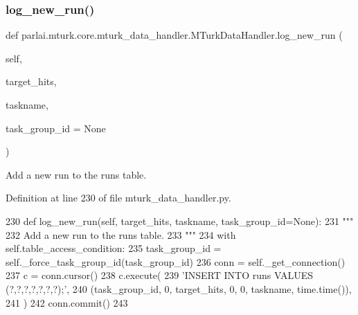 \subsubsection{\texorpdfstring{log\+\_\+new\+\_\+run()}{log\_new\_run()}}
{\footnotesize\ttfamily def parlai.\+mturk.\+core.\+mturk\+\_\+data\+\_\+handler.\+M\+Turk\+Data\+Handler.\+log\+\_\+new\+\_\+run (\begin{DoxyParamCaption}\item[{}]{self,  }\item[{}]{target\+\_\+hits,  }\item[{}]{taskname,  }\item[{}]{task\+\_\+group\+\_\+id = {\ttfamily None} }\end{DoxyParamCaption})}

\begin{DoxyVerb}Add a new run to the runs table.
\end{DoxyVerb}
 

Definition at line 230 of file mturk\+\_\+data\+\_\+handler.\+py.


\begin{DoxyCode}
230     \textcolor{keyword}{def }log\_new\_run(self, target\_hits, taskname, task\_group\_id=None):
231         \textcolor{stringliteral}{"""}
232 \textcolor{stringliteral}{        Add a new run to the runs table.}
233 \textcolor{stringliteral}{        """}
234         with self.table\_access\_condition:
235             task\_group\_id = self.\_force\_task\_group\_id(task\_group\_id)
236             conn = self.\_get\_connection()
237             c = conn.cursor()
238             c.execute(
239                 \textcolor{stringliteral}{'INSERT INTO runs VALUES (?,?,?,?,?,?,?);'},
240                 (task\_group\_id, 0, target\_hits, 0, 0, taskname, time.time()),
241             )
242             conn.commit()
243 
\end{DoxyCode}
\mbox{\label{classparlai_1_1mturk_1_1core_1_1mturk__data__handler_1_1MTurkDataHandler_a8924cb67f6d2e884091eadc0235dd209}} 
